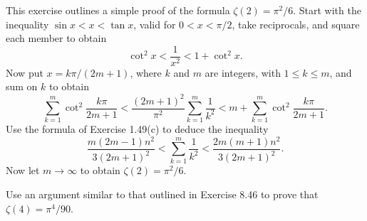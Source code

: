 \begin{problembox}
This exercise outlines a simple proof of the formula \(\zeta(2) = \pi^2/6\). Start with the inequality \(\sin x < x < \tan x\), valid for \(0 < x < \pi/2\), take reciprocals, and square each member to obtain
\[\cot^2 x < \frac{1}{x^2} < 1 + \cot^2 x.\]
Now put \(x = k\pi/(2m + 1)\), where \(k\) and \(m\) are integers, with \(1 \leq k \leq m\), and sum on \(k\) to obtain
\[\sum_{k=1}^{m} \cot^2 \frac{k\pi}{2m + 1} < \frac{(2m + 1)^2}{\pi^2} \sum_{k=1}^{m} \frac{1}{k^2} < m + \sum_{k=1}^{m} \cot^2 \frac{k\pi}{2m + 1}.\]
Use the formula of Exercise 1.49(c) to deduce the inequality
\[\frac{m(2m - 1)n^2}{3(2m + 1)^2} < \sum_{k=1}^m \frac{1}{k^2} < \frac{2m(m + 1)n^2}{3(2m + 1)^2}.\]
Now let \(m \to \infty\) to obtain \(\zeta(2) = \pi^2/6\).
\end{problembox}

\begin{problembox}
Use an argument similar to that outlined in Exercise 8.46 to prove that \(\zeta(4) = \pi^4/90\).
\end{problembox}